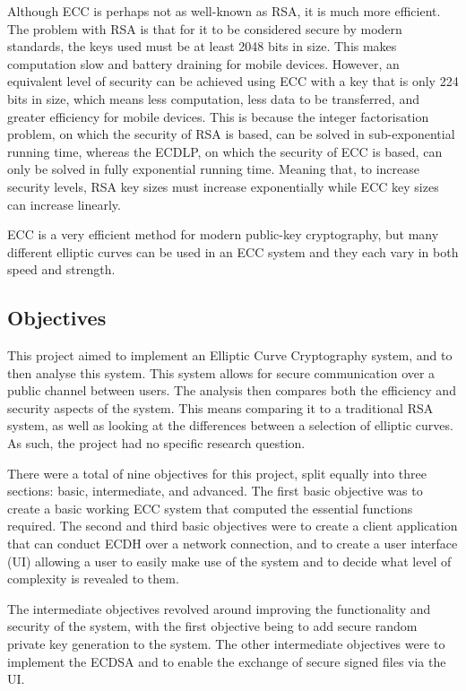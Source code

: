 \documentclass[12pt,a4paper]{article}
\begin{document}
Although ECC is perhaps not as well-known as RSA, it is much more efficient. 
The problem with RSA is that for it to be considered secure by modern standards, the keys used must be at least 2048 bits in size. 
This makes computation slow and battery draining for mobile devices. 
However, an equivalent level of security can be achieved using ECC with a key that is only 224 bits in size, 
which means less computation, less data to be transferred, and greater efficiency for mobile devices. 
This is because the integer factorisation problem, on which the security of RSA is based, can be solved in sub-exponential running time, 
whereas the ECDLP, on which the security of ECC is based, can only be solved in fully exponential running time. 
Meaning that, to increase security levels, RSA key sizes must increase exponentially while ECC key sizes can increase linearly. 

ECC is a very efficient method for modern public-key cryptography, 
but many different elliptic curves can be used in an ECC system and they each vary in both speed and strength. 


\subsection{Objectives} \noindent \label{Objectives}
This project aimed to implement an Elliptic Curve Cryptography system, 
and to then analyse this system. 
This system allows for secure communication over a public channel between users. 
The analysis then compares both the efficiency and security aspects of the system. 
This means comparing it to a traditional RSA system, 
as well as looking at the differences between a selection of elliptic curves. 
As such, the project had no specific research question. 

There were a total of nine objectives for this project, split equally into three sections: basic, intermediate, and advanced. 
The first basic objective was to create a basic working ECC system that computed the essential functions required. 
The second and third basic objectives were to create a client application that can conduct ECDH over a network connection, 
and to create a user interface (UI) allowing a user to easily make use of the system and to decide what level of complexity is revealed to them. 

The intermediate objectives revolved around improving the functionality and security of the system, 
with the first objective being to add secure random private key generation to the system. 
The other intermediate objectives were to implement the ECDSA and to enable the exchange of secure signed files via the UI. 
\end{document}

